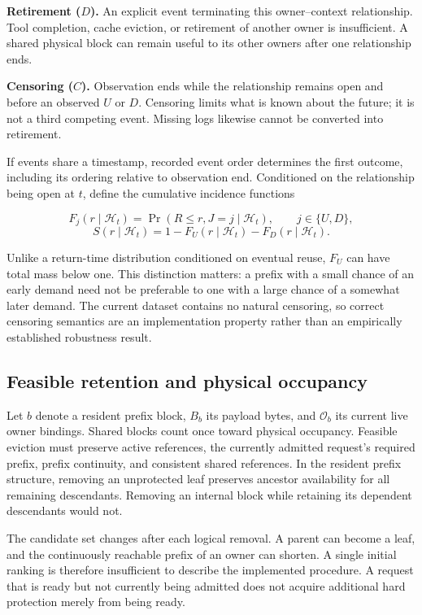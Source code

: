 \documentclass[sigconf, screen, review]{acmart}
\begin{document}
\textbf{Retirement (\(D\)).} An explicit event terminating this
owner--context relationship. Tool completion, cache eviction, or
retirement of another owner is insufficient. A shared physical block can
remain useful to its other owners after one relationship ends.

\textbf{Censoring (\(C\)).} Observation ends while the relationship
remains open and before an observed \(U\) or \(D\). Censoring limits
what is known about the future; it is not a third competing event.
Missing logs likewise cannot be converted into retirement.

If events share a timestamp, recorded event order determines the first
outcome, including its ordering relative to observation end. Conditioned
on the relationship being open at \(t\), define the cumulative incidence
functions

\[
F_j(r\mid\mathcal H_t)=\Pr(R\le r,J=j\mid\mathcal H_t),
\qquad j\in\{U,D\},
\] \[
S(r\mid\mathcal H_t)=1-F_U(r\mid\mathcal H_t)-F_D(r\mid\mathcal H_t).
\]

Unlike a return-time distribution conditioned on eventual reuse, \(F_U\)
can have total mass below one. This distinction matters: a prefix with a
small chance of an early demand need not be preferable to one with a
large chance of a somewhat later demand. The current dataset contains no
natural censoring, so correct censoring semantics are an implementation
property rather than an empirically established robustness result.

\subsection{Feasible retention and physical
occupancy}\label{feasible-retention-and-physical-occupancy}

Let \(b\) denote a resident prefix block, \(B_b\) its payload bytes, and
\(\mathcal O_b\) its current live owner bindings. Shared blocks count
once toward physical occupancy. Feasible eviction must preserve active
references, the currently admitted request's required prefix, prefix
continuity, and consistent shared references. In the resident prefix
structure, removing an unprotected leaf preserves ancestor availability
for all remaining descendants. Removing an internal block while
retaining its dependent descendants would not.

The candidate set changes after each logical removal. A parent can
become a leaf, and the continuously reachable prefix of an owner can
shorten. A single initial ranking is therefore insufficient to describe
the implemented procedure. A request that is ready but not currently
being admitted does not acquire additional hard protection merely from
being ready.
\end{document}
